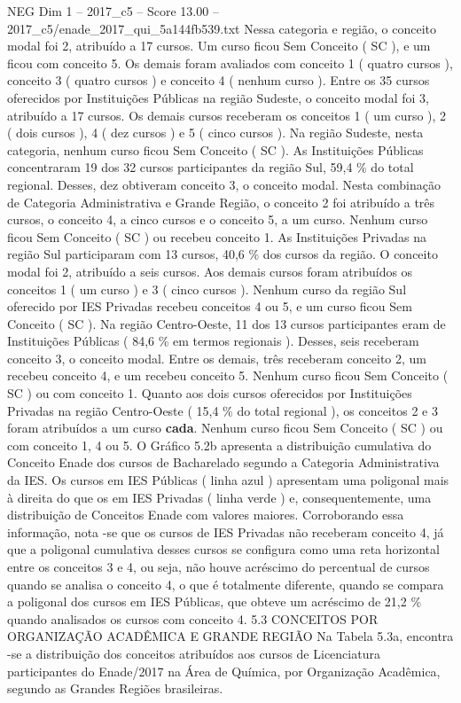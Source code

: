 \begin{textsample}{NEG Dim 1 – 2017\_c5 – Score 13.00 – 2017\_c5/enade\_2017\_qui\_5a144fb539.txt}
Nessa categoria e região, o conceito modal foi 2, atribuído a 17 cursos.
Um curso ficou Sem Conceito ( SC ), e um ficou com conceito 5.
Os demais foram avaliados com conceito 1 ( quatro cursos ), conceito 3 ( quatro cursos ) e conceito 4 ( nenhum curso ).
Entre os 35 cursos oferecidos por Instituições Públicas na região Sudeste, o conceito modal foi 3, atribuído a 17 cursos.
Os demais cursos receberam os conceitos 1 ( um curso ), 2 ( dois cursos ), 4 ( dez cursos ) e 5 ( cinco cursos ).
Na região Sudeste, nesta categoria, nenhum curso ficou Sem Conceito ( SC ).
As Instituições Públicas concentraram 19 dos 32 cursos participantes da região Sul, 59,4 \% do total regional.
Desses, dez obtiveram conceito 3, o conceito modal.
Nesta combinação de Categoria Administrativa e Grande Região, o conceito 2 foi atribuído a três cursos, o conceito 4, a cinco cursos e o conceito 5, a um curso.
Nenhum curso ficou Sem Conceito ( SC ) ou recebeu conceito 1.
As Instituições Privadas na região Sul participaram com 13 cursos, 40,6 \% dos cursos da região.
O conceito modal foi 2, atribuído a seis cursos.
Aos demais cursos foram atribuídos os conceitos 1 ( um curso ) e 3 ( cinco cursos ).
Nenhum curso da região Sul oferecido por IES Privadas recebeu conceitos 4 ou 5, e um curso ficou Sem Conceito ( SC ).
Na região Centro-Oeste, 11 dos 13 cursos participantes eram de Instituições Públicas ( 84,6 \% em termos regionais ).
Desses, seis receberam conceito 3, o conceito modal.
Entre os demais, três receberam conceito 2, um recebeu conceito 4, e um recebeu conceito 5.
Nenhum curso ficou Sem Conceito ( SC ) ou com conceito 1.
Quanto aos dois cursos oferecidos por Instituições Privadas na região Centro-Oeste ( 15,4 \% do total regional ), os conceitos 2 e 3 foram atribuídos a um curso \textbf{cada}.
Nenhum curso ficou Sem Conceito ( SC ) ou com conceito 1, 4 ou 5.
O Gráfico 5.2b apresenta a distribuição cumulativa do Conceito Enade dos cursos de Bacharelado segundo a Categoria Administrativa da IES.
Os cursos em IES Públicas ( linha azul ) apresentam uma poligonal mais à direita do que os em IES Privadas ( linha verde ) e, consequentemente, uma distribuição de Conceitos Enade com valores maiores.
Corroborando essa informação, nota -se que os cursos de IES Privadas não receberam conceito 4, já que a poligonal cumulativa desses cursos se configura como uma reta horizontal entre os conceitos 3 e 4, ou seja, não houve acréscimo do percentual de cursos quando se analisa o conceito 4, o que é totalmente diferente, quando se compara a poligonal dos cursos em IES Públicas, que obteve um acréscimo de 21,2 \% quando analisados os cursos com conceito 4. 5.3 CONCEITOS POR ORGANIZAÇÃO ACADÊMICA E GRANDE REGIÃO Na Tabela 5.3a, encontra -se a distribuição dos conceitos atribuídos aos cursos de Licenciatura participantes do Enade/2017 na Área de Química, por Organização Acadêmica, segundo as Grandes Regiões brasileiras.

\end{textsample}
